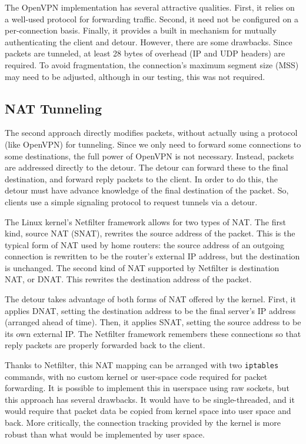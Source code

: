 \documentclass{cwru}
\begin{document}

The OpenVPN implementation has several attractive qualities. First, it relies on
a well-used protocol for forwarding traffic. Second, it need not be configured
on a per-connection basis. Finally, it provides a built in mechanism for
mutually authenticating the client and detour. However, there are some
drawbacks. Since packets are tunneled, at least 28 bytes of overhead (IP and UDP
headers) are required. To avoid fragmentation, the connection's maximum segment
size (MSS) may need to be adjusted, although in our testing, this was not
required.

\subsection{NAT Tunneling}

The second approach directly modifies packets, without actually using a protocol
(like OpenVPN) for tunneling. Since we only need to forward some connections to
some destinations, the full power of OpenVPN is not necessary. Instead, packets
are addressed directly to the detour. The detour can forward these to the
final destination, and forward reply packets to the client. In order to do this,
the detour must have advance knowledge of the final destination of the packet.
So, clients use a simple signaling protocol to request tunnels via a detour.

The Linux kernel's Netfilter framework allows for two types of NAT. The first
kind, source NAT (SNAT), rewrites the source address of the packet. This is
the typical form of NAT used by home routers: the source address of an outgoing
connection is rewritten to be the router's external IP address, but the
destination is unchanged. The second kind of NAT supported by Netfilter is
destination NAT, or DNAT. This rewrites the destination address of the packet.


The detour takes advantage of both forms of NAT offered by the kernel. First, it
applies DNAT, setting the destination address to be the final server's IP
address (arranged ahead of time). Then, it applies SNAT, setting the source
address to be its own external IP. The Netfilter framework remembers these
connections so that reply packets are properly forwarded back to the client.

Thanks to Netfilter, this NAT mapping can be arranged with two \texttt{iptables}
commands, with no custom kernel or user-space code required for packet
forwarding. It is possible to implement this in userspace using raw sockets, but
this approach has several drawbacks. It would have to be single-threaded, and it
would require that packet data be copied from kernel space into user space and
back. More critically, the connection tracking provided by the kernel is more
robust than what would be implemented by user space.
\end{document}

